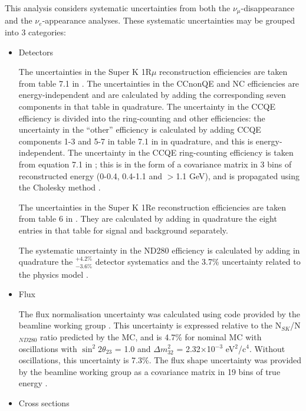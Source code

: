 This analysis considers systematic uncertainties from both the $\nu_{\mu}$-disappearance and the $\nu_{e}$-appearance analyses. 
These systematic uncertainties may be grouped into 3 categories:
\begin{itemize}
\item
Detectors 
\vspace{1.5 mm}

The uncertainties in the Super K 1R$\mu$ reconstruction efficiencies are taken from table 7.1 in \cite{TN065}. The uncertainties in the 
CCnonQE and NC efficiencies are energy-independent and are calculated by adding the corresponding seven components in that table in quadrature. 
The uncertainty in the CCQE efficiency is divided into the ring-counting and other efficiencies: the uncertainty in the ``other'' efficiency 
is calculated by adding CCQE components 1-3 and 5-7 in table 7.1 in \cite{TN065} in quadrature, and this is energy-independent. The uncertainty 
in the CCQE ring-counting efficiency is taken from equation 7.1 in \cite{TN065}; this is in the form of a covariance matrix in 3 bins of 
reconstructed energy (0-0.4, 0.4-1.1 and $>$1.1 GeV), and is propagated using the Cholesky method \cite{Cholesky}. 

The uncertainties in the Super K 1Re reconstruction efficiencies are taken from table 6 in \cite{NueRun1and2Analysis}. They are calculated 
by adding in quadrature the eight entries in that table for signal and background separately. 

The systematic uncertainty in the ND280 efficiency is calculated by adding in quadrature the $^{+4.2\%}_{-3.6\%}$ detector systematics and the 
3.7\% uncertainty related to the physics model \cite{ND280Error}.

\item
Flux
\vspace{1.5 mm}

The flux normalisation uncertainty was calculated using code provided by the beamline working group \cite{FluxNormError}. This 
uncertainty is expressed relative to the N$_{SK}$/N$_{ND280}$ ratio predicted by the MC, and is 4.7\% for nominal MC with oscillations 
with $\sin^{2}2\theta_{23}$ = 1.0 and $\Delta m^{2}_{32}$ = 2.32$\times$10$^{-3}$ eV$^{2}$/c$^{4}$. Without oscillations, this 
uncertainty is 7.3\%. The flux shape uncertainty was provided by the beamline working group as a covariance matrix in 19 bins of true 
energy \cite{FluxShapeError}.

\item
Cross sections
\vspace{1.5 mm}


\end{itemize}
